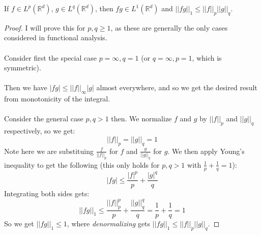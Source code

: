 \documentclass[12pt]{article}
\newcommand{\R}{\mathbb{R}}
\newenvironment{theorem}[2][Theorem]{\begin{trivlist}
\item[\hskip \labelsep {\bfseries #1}\hskip \labelsep {\bfseries #2.}]}{\end{trivlist}}
\begin{document}
\begin{theorem}{(Hölder's Inequality)}
    If $f \in L^p(\R^d)$, $g \in L^q(\R^d)$, then $fg \in L^1(\mathbb{R}^d)$ and $||fg||_1 \leq ||f||_p||g||_q$.
\begin{proof}
    I will prove this for $p,q \geq 1$, as these are generally the only cases considered in functional analysis. \\ \\
    Consider first the special case $p = \infty, q = 1$ (or $q = \infty, p = 1$, which is symmetric). \\ \\
    Then we have $|fg| \leq ||f||_\infty|g|$ almost everywhere, and so we get the desired result from monotonicity of the integral. \\ \\
    Consider the general case $p, q > 1$ then. We normalize $f$ and $g$ by $||f||_p$ and $||g||_q$ respectively, so we get:
    $$||f||_p = ||g||_q = 1$$
    Note here we are substituing $\frac{f}{||f||_p}$ for $f$ and $\frac{g}{||g||_q}$ for $g$. We then apply Young's inequality to get the following (this only holds for $p, q > 1$ with $\frac{1}{p} + \frac{1}{q} = 1$):
    $$|fg| \leq \frac{|f|^p}{p} + \frac{|g|^q}{q}$$
    Integrating both sides gets:
    $$||fg||_1 \leq \frac{||f||_p^p}{p} + \frac{||g||_q^q}{q} = \frac{1}{p} + \frac{1}{q} = 1$$
    So we get $||fg||_1 \leq 1$, where \textit{denormalizing} gets $||fg||_1 \leq ||f||_p||g||_q$. 
\end{proof}
\end{theorem}
\end{document}

